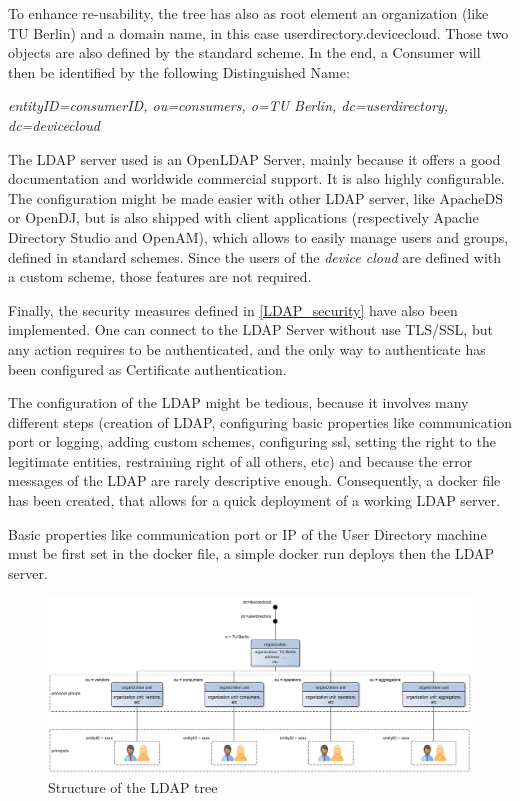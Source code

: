 To enhance re-usability, the tree has also as root element an organization (like TU Berlin) and a domain name, in this case userdirectory.devicecloud. Those two objects are also defined by the standard scheme. In the end, a Consumer will then be identified by the following Distinguished Name:

\quad \quad \textit{entityID=consumerID, ou=consumers, o=TU Berlin, dc=userdirectory, dc=devicecloud}

The LDAP server used is an OpenLDAP Server, mainly because it offers a good documentation and worldwide commercial support. It is also highly configurable. The configuration might be made easier with other LDAP server, like ApacheDS or OpenDJ, but is also shipped with client applications (respectively Apache Directory Studio and OpenAM), which allows to easily manage users and groups, defined in standard schemes. Since the users of the \emph{device cloud} are defined with a custom scheme, those features are not required.

Finally, the security measures defined in \ref{LDAP_security} have also been implemented. One can connect to the LDAP Server without use TLS/SSL, but any action requires to be authenticated, and the only way to authenticate has been configured as Certificate authentication.

The configuration of the LDAP might be tedious, because it involves many different steps (creation of LDAP, configuring basic properties like communication port or logging, adding custom schemes, configuring ssl, setting the right to the legitimate entities, restraining right of all others, etc) and because the error messages of the LDAP are rarely descriptive enough. Consequently, a docker file has been created, that allows for a quick deployment of a working LDAP server. 

Basic properties like communication port or IP of the User Directory machine must be first set in the docker file, a simple docker run deploys then the LDAP server.


\begin{figure}[tbhp]
	\centering
	\caption{Structure of the LDAP tree}
	\label{ldap_tree}
	\includegraphics[angle=90,height=\textheight]{images/ldap_tree}
\end{figure}

